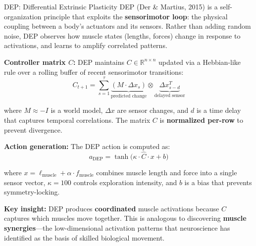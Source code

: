\documentclass[landscape]{article}
\begin{document}
\begin{minipage}[t]{0.255\textwidth}

\begin{posterblock}{DEP: Differential Extrinsic Plasticity}
\fontsize{13}{16}\selectfont
DEP (Der \& Martius, 2015) is a self-organization principle that exploits the \textbf{sensorimotor loop}: the physical coupling between a body's actuators and its sensors. Rather than adding random noise, DEP observes how muscle states (lengths, forces) change in response to activations, and learns to amplify correlated patterns.

\vspace{4pt}
\textbf{Controller matrix $C$:} DEP maintains $C \in \mathbb{R}^{n \times n}$ updated via a Hebbian-like rule over a rolling buffer of recent sensorimotor transitions:
\vspace{-2pt}
\[
C_{t+1} = \textstyle\sum_{s=1}^{\tau} \underbrace{(M \cdot \Delta x_s)}_{\text{predicted change}} \otimes \underbrace{\Delta x_{s-d}^T}_{\text{delayed sensor}}
\]
\vspace{-6pt}

where $M \approx -I$ is a world model, $\Delta x$ are sensor changes, and $d$ is a time delay that captures temporal correlations. The matrix $C$ is \textbf{normalized per-row} to prevent divergence.

\vspace{4pt}
\textbf{Action generation:} The DEP action is computed as:
\vspace{-2pt}
\[
a_{\text{DEP}} = \tanh\!\big(\kappa \cdot \hat{C} \cdot x + b\big)
\]
\vspace{-6pt}

where $x = \ell_{\text{muscle}} + \alpha \cdot f_{\text{muscle}}$ combines muscle length and force into a single sensor vector, $\kappa{=}100$ controls exploration intensity, and $b$ is a bias that prevents symmetry-locking.

\vspace{4pt}
\textbf{Key insight:} DEP produces \textbf{coordinated} muscle activations because $C$ captures which muscles move together. This is analogous to discovering \textbf{muscle synergies}---the low-dimensional activation patterns that neuroscience has identified as the basis of skilled biological movement.
\end{posterblock}

\end{minipage}%
\hfill
\end{document}
